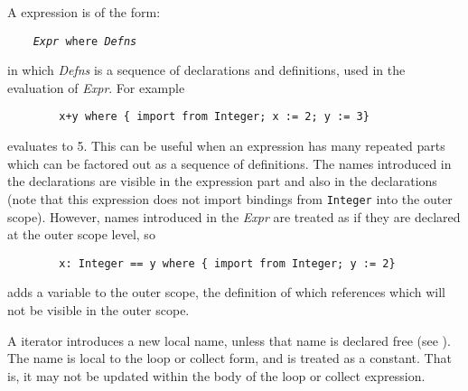 
A  expression is of the form:

\verb^    ^{\tt {\em Expr} where {\em Defns}}

in which {\em Defns} is a sequence of declarations and definitions,
used in the evaluation of {\em Expr}. For example

\begin{small}
\begin{verbatim}
        x+y where { import from Integer; x := 2; y := 3}
\end{verbatim}
\end{small}

evaluates to 5. This can be useful when an expression has many
repeated parts which can be factored out as a sequence of
definitions. The names introduced in the declarations are visible in
the expression part and also in the declarations (note that
this expression does not import bindings from {\tt Integer} into the
outer scope). However, names introduced in the {\em Expr} are treated
as if they are declared at the outer scope level, so

\begin{small}
\begin{verbatim}
        x: Integer == y where { import from Integer; y := 2}
\end{verbatim}
\end{small}

adds a variable  to the outer scope, the definition of which
references  which will not be visible in the outer scope.



A  iterator introduces a new local name, unless that name
is declared free (see ).
The name is local to the  loop or collect form,
and is treated as a constant.  That is, it may not be updated within the
body of the loop or collect expression.


